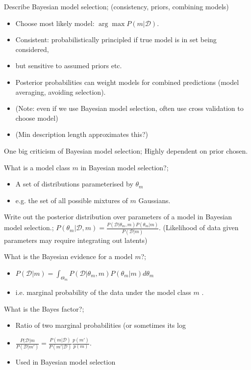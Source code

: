 \documentclass{article}
\begin{document}
Describe Bayesian model selection; (consistency, priors, combining models) \begin{itemize} \item Choose most likely model: $\arg\max P(m|\mathcal{D})$.  \item Consistent: probabilistically principled if true model is in set being considered, \item but sensitive to assumed priors etc.  \item Posterior probabilities can weight models for combined predictions (model averaging, avoiding selection).  \item (Note: even if we use Bayesian model selection, often use cross validation to choose model) \item (Min description length approximates this?) \end{itemize}

One big criticism of Bayesian model selection; Highly dependent on prior chosen.

What is a model class $m$ in Bayesian model selection?; \begin{itemize} \item A set of distributions parameterised by $\theta_m$ \item e.g. the set of all possible mixtures of $m$ Gaussians.  \end{itemize}

Write out the posterior distribution over parameters of a model in Bayesian model selection.; $P(\theta_m|\mathcal{D}, m) = \frac{P(\mathcal{D}|\theta_m, m)P(\theta_m|m)}{P(\mathcal{D}|m)}$. (Likelihood of data given parameters may require integrating out latents)

What is the Bayesian evidence for a model $m$?; \begin{itemize} \item $P(\mathcal{D}|m)=\int_{\Theta_m}P(\mathcal{D}|\theta_m, m)P(\theta_m|m)d\theta_m$ \item i.e. marginal probability of the data under the model class $m$ .  \end{itemize}

What is the Bayes factor?; \begin{itemize} \item Ratio of two marginal probabilities (or sometimes its log \item $\frac{P(\mathcal{D}|m}{P(\mathcal{D}|m')}=\frac{P(m|\mathcal{D})}{P(m'|\mathcal{D})}\frac{p(m')}{p(m)}$.  \item Used in Bayesian model selection \end{itemize}
\end{document}
